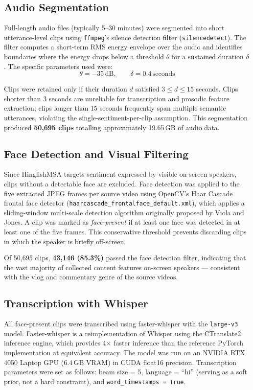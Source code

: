 \subsection{Audio Segmentation}

Full-length audio files (typically 5--30 minutes) were segmented into short utterance-level clips using \texttt{ffmpeg}'s silence detection filter (\texttt{silencedetect}). The filter computes a short-term RMS energy envelope over the audio and identifies boundaries where the energy drops below a threshold $\theta$ for a sustained duration $\delta$. The specific parameters used were:
\[
\theta = -35\,\text{dB}, \qquad \delta = 0.4\,\text{seconds}
\]

Clips were retained only if their duration $d$ satisfied $3 \leq d \leq 15$ seconds. Clips shorter than 3 seconds are unreliable for transcription and prosodic feature extraction; clips longer than 15 seconds frequently span multiple semantic utterances, violating the single-sentiment-per-clip assumption. This segmentation produced \textbf{50,695 clips} totalling approximately 19.65\,GB of audio data.

\subsection{Face Detection and Visual Filtering}

Since HinglishMSA targets sentiment expressed by visible on-screen speakers, clips without a detectable face are excluded. Face detection was applied to the five extracted JPEG frames per source video using OpenCV's Haar Cascade frontal face detector (\texttt{haarcascade\_frontalface\_default.xml}), which applies a sliding-window multi-scale detection algorithm originally proposed by Viola and Jones. A clip was marked as \textit{face-present} if at least one face was detected in at least one of the five frames. This conservative threshold prevents discarding clips in which the speaker is briefly off-screen.

Of 50,695 clips, \textbf{43,146 (85.3\%)} passed the face detection filter, indicating that the vast majority of collected content features on-screen speakers — consistent with the vlog and commentary genre of the source videos.

\subsection{Transcription with Whisper}

All face-present clips were transcribed using faster-whisper \cite{radford2023whisper} with the \texttt{large-v3} model. Faster-whisper is a reimplementation of Whisper using the CTranslate2 inference engine, which provides 4$\times$ faster inference than the reference PyTorch implementation at equivalent accuracy. The model was run on an NVIDIA RTX 4050 Laptop GPU (6.4\,GB VRAM) in CUDA float16 precision. Transcription parameters were set as follows: beam size = 5, language = ``hi'' (serving as a soft prior, not a hard constraint), and \texttt{word\_timestamps = True}.

